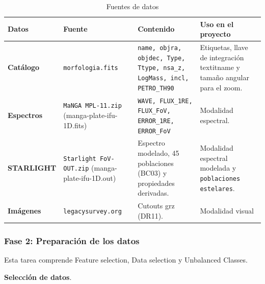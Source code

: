 \documentclass[12pt]{article}
\begin{document}
\begin{itemize}
    \begin{table}[H]
        \centering
        \scriptsize
        \begin{tabular}{|p{}|p{}|p{}|p{}|}
        \hline
        \textbf{Datos} & \textbf{Fuente} & \textbf{Contenido} & \textbf{Uso en el proyecto} \\
        \hline

        \textbf{Catálogo} &
        \texttt{morfologia.fits} &
        \texttt{name, objra, objdec, Type, Ttype, nsa\_z, LogMass, incl, PETRO\_TH90} &
        Etiquetas, llave de integración textit{name} y tamaño angular para el zoom. \\ \hline

        \textbf{Espectros} &
        \texttt{MaNGA MPL-11.zip} (manga-plate-ifu-1D.fits) &
        \texttt{WAVE, FLUX\_1RE, FLUX\_FoV, ERROR\_1RE, ERROR\_FoV} &
        Modalidad espectral. \\ \hline

        \textbf{STARLIGHT} &
        \texttt{Starlight FoV-OUT.zip} (manga-plate-ifu-1D.out) &
        Espectro modelado, 45 poblaciones (BC03) y propiedades derivadas. &
        Modalidad espectral modelada y \texttt{poblaciones estelares}.\\ \hline

        \textbf{Imágenes} &
        \texttt{legacysurvey.org} &
        Cutouts grz (DR11). &
        Modalidad visual\\ \hline

        \end{tabular}
        \caption{Fuentes de datos}
        \label{aplicacion}
    \end{table}

\end{itemize}

\subsubsection{Fase 2: Preparación de los datos}

Esta tarea comprende Feature selection, Data selection y Unbalanced Classes.

\textbf{Selección de datos}.
\end{document}

